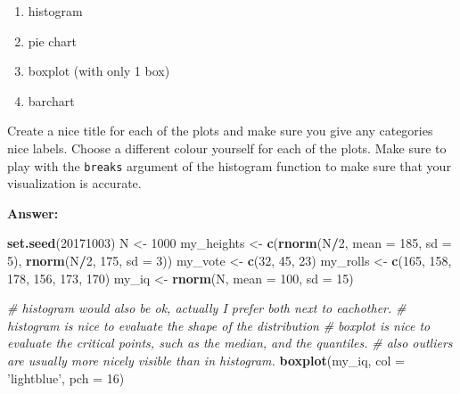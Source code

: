 \documentclass[]{article}
\newenvironment{Shaded}{\begin{snugshade}}{\end{snugshade}}
\newcommand{\CommentTok}[1]{\textcolor[rgb]{0.56,0.35,0.01}{\textit{#1}}}
\newcommand{\DataTypeTok}[1]{\textcolor[rgb]{0.13,0.29,0.53}{#1}}
\newcommand{\DecValTok}[1]{\textcolor[rgb]{0.00,0.00,0.81}{#1}}
\newcommand{\KeywordTok}[1]{\textcolor[rgb]{0.13,0.29,0.53}{\textbf{#1}}}
\newcommand{\NormalTok}[1]{#1}
\newcommand{\OperatorTok}[1]{\textcolor[rgb]{0.81,0.36,0.00}{\textbf{#1}}}
\newcommand{\StringTok}[1]{\textcolor[rgb]{0.31,0.60,0.02}{#1}}
\providecommand{\tightlist}{%
  \setlength{\itemsep}{0pt}\setlength{\parskip}{0pt}}
\begin{document}
\begin{enumerate}
\def\labelenumi{\alph{enumi}.}
\tightlist
\item
  histogram
\item
  pie chart
\item
  boxplot (with only 1 box)
\item
  barchart
\end{enumerate}

Create a nice title for each of the plots and make sure you give any
categories nice labels. Choose a different colour yourself for each of
the plots. Make sure to play with the \texttt{breaks} argument of the
histogram function to make sure that your visualization is accurate.

\textbf{Answer:}

\begin{Shaded}
\begin{Highlighting}[]
\KeywordTok{set.seed}\NormalTok{(}\DecValTok{20171003}\NormalTok{)}
\NormalTok{N <-}\StringTok{ }\DecValTok{1000}
\NormalTok{my_heights <-}\StringTok{ }\KeywordTok{c}\NormalTok{(}\KeywordTok{rnorm}\NormalTok{(N}\OperatorTok{/}\DecValTok{2}\NormalTok{, }\DataTypeTok{mean =} \DecValTok{185}\NormalTok{, }\DataTypeTok{sd =} \DecValTok{5}\NormalTok{), }\KeywordTok{rnorm}\NormalTok{(N}\OperatorTok{/}\DecValTok{2}\NormalTok{, }\DecValTok{175}\NormalTok{, }\DataTypeTok{sd =} \DecValTok{3}\NormalTok{))}
\NormalTok{my_vote <-}\StringTok{ }\KeywordTok{c}\NormalTok{(}\DecValTok{32}\NormalTok{, }\DecValTok{45}\NormalTok{, }\DecValTok{23}\NormalTok{)}
\NormalTok{my_rolls <-}\StringTok{ }\KeywordTok{c}\NormalTok{(}\DecValTok{165}\NormalTok{, }\DecValTok{158}\NormalTok{, }\DecValTok{178}\NormalTok{, }\DecValTok{156}\NormalTok{, }\DecValTok{173}\NormalTok{, }\DecValTok{170}\NormalTok{)}
\NormalTok{my_iq <-}\StringTok{ }\KeywordTok{rnorm}\NormalTok{(N, }\DataTypeTok{mean =} \DecValTok{100}\NormalTok{, }\DataTypeTok{sd =} \DecValTok{15}\NormalTok{)}

\CommentTok{# histogram would also be ok, actually I prefer both next to eachother.}
\CommentTok{# histogram is nice to evaluate the shape of the distribution}
\CommentTok{# boxplot is nice to evaluate the critical points, such as the median, and the quantiles.}
\CommentTok{# also outliers are usually more nicely visible than in histogram.}
\KeywordTok{boxplot}\NormalTok{(my_iq, }\DataTypeTok{col =} \StringTok{'lightblue'}\NormalTok{, }\DataTypeTok{pch =} \DecValTok{16}\NormalTok{)}
\end{Highlighting}
\end{Shaded}
\end{document}
